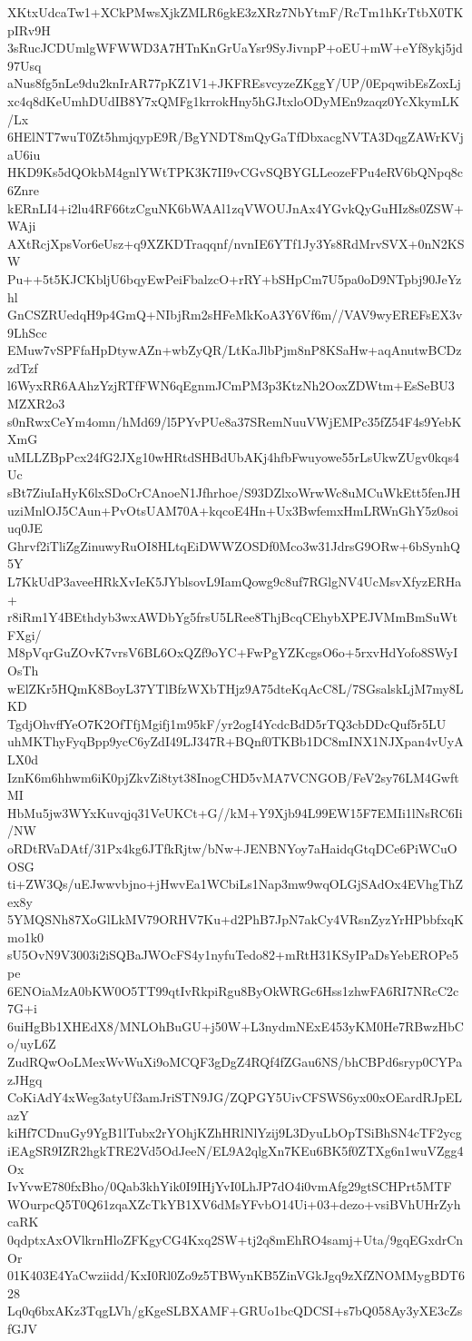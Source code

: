 XKtxUdcaTw1+XCkPMwsXjkZMLR6gkE3zXRz7NbYtmF/RcTm1hKrTtbX0TKpIRv9H
3sRucJCDUmlgWFWWD3A7HTnKnGrUaYsr9SyJivnpP+oEU+mW+eYf8ykj5jd97Usq
aNus8fg5nLe9du2knIrAR77pKZ1V1+JKFREsvcyzeZKggY/UP/0EpqwibEsZoxLj
xc4q8dKeUmhDUdIB8Y7xQMFg1krrokHny5hGJtxloODyMEn9zaqz0YcXkymLK/Lx
6HElNT7wuT0Zt5hmjqypE9R/BgYNDT8mQyGaTfDbxacgNVTA3DqgZAWrKVjaU6iu
HKD9Ks5dQOkbM4gnlYWtTPK3K7II9vCGvSQBYGLLeozeFPu4eRV6bQNpq8c6Znre
kERnLI4+i2lu4RF66tzCguNK6bWAAl1zqVWOUJnAx4YGvkQyGuHIz8s0ZSW+WAji
AXtRcjXpsVor6eUsz+q9XZKDTraqqnf/nvnIE6YTf1Jy3Ys8RdMrvSVX+0nN2KSW
Pu++5t5KJCKbljU6bqyEwPeiFbalzcO+rRY+bSHpCm7U5pa0oD9NTpbj90JeYzhl
GnCSZRUedqH9p4GmQ+NIbjRm2sHFeMkKoA3Y6Vf6m//VAV9wyEREFsEX3v9LhScc
EMuw7vSPFfaHpDtywAZn+wbZyQR/LtKaJlbPjm8nP8KSaHw+aqAnutwBCDzzdTzf
l6WyxRR6AAhzYzjRTfFWN6qEgnmJCmPM3p3KtzNh2OoxZDWtm+EsSeBU3MZXR2o3
s0nRwxCeYm4omn/hMd69/l5PYvPUe8a37SRemNuuVWjEMPc35fZ54F4s9YebKXmG
uMLLZBpPcx24fG2JXg10wHRtdSHBdUbAKj4hfbFwuyowe55rLsUkwZUgv0kqs4Uc
sBt7ZiuIaHyK6lxSDoCrCAnoeN1Jfhrhoe/S93DZlxoWrwWc8uMCuWkEtt5fenJH
uziMnlOJ5CAun+PvOtsUAM70A+kqcoE4Hn+Ux3BwfemxHmLRWnGhY5z0soiuq0JE
Ghrvf2iTliZgZinuwyRuOI8HLtqEiDWWZOSDf0Mco3w31JdrsG9ORw+6bSynhQ5Y
L7KkUdP3aveeHRkXvIeK5JYblsovL9IamQowg9c8uf7RGlgNV4UcMsvXfyzERHa+
r8iRm1Y4BEthdyb3wxAWDbYg5frsU5LRee8ThjBcqCEhybXPEJVMmBmSuWtFXgi/
M8pVqrGuZOvK7vrsV6BL6OxQZf9oYC+FwPgYZKcgsO6o+5rxvHdYofo8SWyIOsTh
wElZKr5HQmK8BoyL37YTlBfzWXbTHjz9A75dteKqAcC8L/7SGsalskLjM7my8LKD
TgdjOhvffYeO7K2OfTfjMgifj1m95kF/yr2ogI4YcdcBdD5rTQ3cbDDcQuf5r5LU
uhMKThyFyqBpp9ycC6yZdI49LJ347R+BQnf0TKBb1DC8mINX1NJXpan4vUyALX0d
IznK6m6hhwm6iK0pjZkvZi8tyt38InogCHD5vMA7VCNGOB/FeV2sy76LM4GwftMI
HbMu5jw3WYxKuvqjq31VeUKCt+G//kM+Y9Xjb94L99EW15F7EMIi1lNsRC6Ii/NW
oRDtRVaDAtf/31Px4kg6JTfkRjtw/bNw+JENBNYoy7aHaidqGtqDCe6PiWCuOOSG
ti+ZW3Qs/uEJwwvbjno+jHwvEa1WCbiLs1Nap3mw9wqOLGjSAdOx4EVhgThZex8y
5YMQSNh87XoGlLkMV79ORHV7Ku+d2PhB7JpN7akCy4VRsnZyzYrHPbbfxqKmo1k0
sU5OvN9V3003i2iSQBaJWOcFS4y1nyfuTedo82+mRtH31KSyIPaDsYebEROPe5pe
6ENOiaMzA0bKW0O5TT99qtIvRkpiRgu8ByOkWRGc6Hss1zhwFA6RI7NRcC2c7G+i
6uiHgBb1XHEdX8/MNLOhBuGU+j50W+L3nydmNExE453yKM0He7RBwzHbCo/uyL6Z
ZudRQwOoLMexWvWuXi9oMCQF3gDgZ4RQf4fZGau6NS/bhCBPd6sryp0CYPazJHgq
CoKiAdY4xWeg3atyUf3amJriSTN9JG/ZQPGY5UivCFSWS6yx00xOEardRJpELazY
kiHf7CDnuGy9YgB1lTubx2rYOhjKZhHRlNlYzij9L3DyuLbOpTSiBhSN4cTF2ycg
iEAgSR9IZR2hgkTRE2Vd5OdJeeN/EL9A2qlgXn7KEu6BK5f0ZTXg6n1wuVZgg4Ox
IvYvwE780fxBho/0Qab3khYik0I9IHjYvI0LhJP7dO4i0vmAfg29gtSCHPrt5MTF
WOurpcQ5T0Q61zqaXZcTkYB1XV6dMsYFvbO14Ui+03+dezo+vsiBVhUHrZyhcaRK
0qdptxAxOVlkrnHloZFKgyCG4Kxq2SW+tj2q8mEhRO4samj+Uta/9gqEGxdrCnOr
01K403E4YaCwziidd/KxI0Rl0Zo9z5TBWynKB5ZinVGkJgq9zXfZNOMMygBDT628
Lq0q6bxAKz3TqgLVh/gKgeSLBXAMF+GRUo1bcQDCSI+s7bQ058Ay3yXE3cZsfGJV
